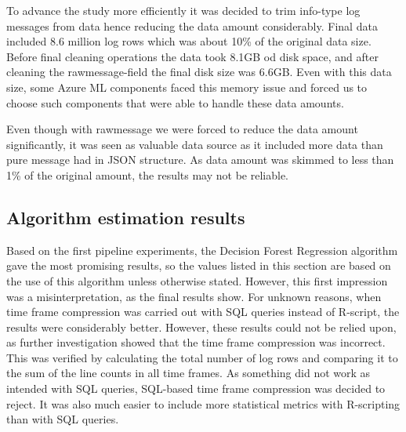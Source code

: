 To advance the study more efficiently
it was decided to trim info-type log messages from data
hence reducing the data amount considerably.
Final data included 8.6 million log rows
which was about 10\% of the original data size.
Before final cleaning operations
the data took 8.1GB od disk space,
and after cleaning the rawmessage-field
the final disk size was 6.6GB\@.
Even with this data size,
some Azure ML components faced this memory issue
and forced us to choose such components
that were able to handle these data amounts.



Even though with rawmessage we were forced to reduce the data amount significantly,
it was seen as valuable data source
as it included more data than pure message had in JSON structure.
As data amount was skimmed to less than 1\% of the original amount,
the results may not be reliable.



\subsection{Algorithm estimation results}\label{subsec:res-algorithm-estimation-results}

Based on the first pipeline experiments,
the Decision Forest Regression algorithm gave the most promising results,
so the values listed in this section are based on the use of this algorithm unless otherwise stated.
However, this first impression was a misinterpretation,
as the final results show.
For unknown reasons,
when time frame compression was carried out with SQL queries instead of R-script,
the results were considerably better.
However, these results could not be relied upon,
as further investigation showed that the time frame compression was incorrect.
This was verified by calculating the total number of log rows
and comparing it to the sum of the line counts in all time frames.
As something did not work as intended with SQL queries,
SQL-based time frame compression was decided to reject.
It was also much easier to include more statistical metrics
with R-scripting than with SQL queries.


